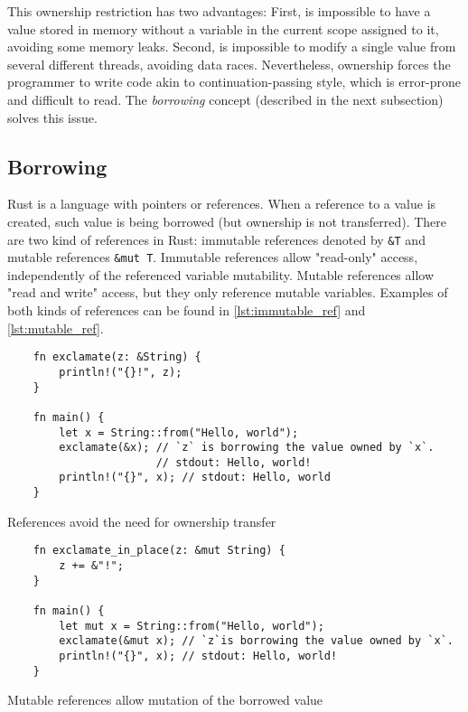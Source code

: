 This ownership restriction has two advantages: First, is impossible to have a value stored in memory without a variable in the current scope assigned to it, avoiding some memory leaks. Second, is impossible to modify a single value from several different threads, avoiding data races. Nevertheless, ownership forces the programmer to write code akin to continuation-passing style, which is error-prone and difficult to read. The \textit{borrowing} concept (described in the next subsection) solves this issue.

\subsection{Borrowing}
Rust is a language with pointers or references. When a reference to a value is created, such value is being borrowed (but ownership is not transferred). There are two kind of references in Rust: immutable references denoted by \texttt{&T} and mutable references \texttt{&mut T}. Immutable references allow "read-only" access, independently of the referenced variable mutability. Mutable references allow "read and write" access, but they only reference mutable variables. Examples of both kinds of references can be found in \ref{lst:immutable_ref} and \ref{lst:mutable_ref}.

\begin{listing}
	\begin{verbatim}
    fn exclamate(z: &String) {
        println!("{}!", z);
    }

    fn main() {
        let x = String::from("Hello, world");
        exclamate(&x); // `z` is borrowing the value owned by `x`.
                       // stdout: Hello, world! 
        println!("{}", x); // stdout: Hello, world
    }
	\end{verbatim}
  \caption{References avoid the need for ownership transfer}
  \label{lst:immutable_ref}
\end{listing}

\begin{listing}
	\begin{verbatim}
    fn exclamate_in_place(z: &mut String) {
        z += &"!";    
    }

    fn main() {
        let mut x = String::from("Hello, world");
        exclamate(&mut x); // `z`is borrowing the value owned by `x`.
        println!("{}", x); // stdout: Hello, world!
    }
	\end{verbatim}
  \caption{Mutable references allow mutation of the borrowed value}
  \label{lst:mutable_ref}
\end{listing}

